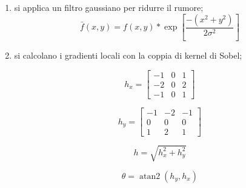 \begin{enumerate}
    \item si applica un filtro gaussiano per ridurre il rumore;
    \begin{equation*}
        \bar{f}(x,y)=f(x,y)*\exp{\left[\frac{-(x^2+y^2)}{2\sigma^2}\right]}
    \end{equation*}
    \item si calcolano i gradienti locali con la coppia di kernel di Sobel;
    \begin{center}
    \begin{minipage}{0.46\textwidth} %
        \centering
        \begin{equation*}
        h_x=\begin{bmatrix}
            -1 & 0 & 1\\
            -2 & 0 & 2\\
            -1 & 0 & 1
        \end{bmatrix}
    \end{equation*}
    \end{minipage}
    \hfill %
    \begin{minipage}{0.46\textwidth} %
        \centering
        \begin{equation*}
        h_y=\begin{bmatrix}
            -1 & -2 & -1\\
            0 & 0 & 0\\
            1 & 2 & 1
        \end{bmatrix}
    \end{equation*}
    \end{minipage}
    \end{center}
     \begin{center}
    \begin{minipage}{0.46\textwidth} %
        \centering
        \begin{equation*}
        h=\sqrt{h_x^2+h_y^2}
    \end{equation*}
    \end{minipage}
    \hfill %
    \begin{minipage}{0.46\textwidth} %
        \centering
        \begin{equation*}
        \theta =  \operatorname{atan2}(h_y, h_x)

\end{equation*}
\end{minipage}
\end{center}
\end{enumerate}

